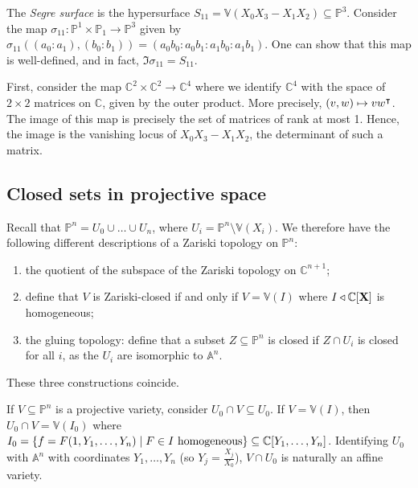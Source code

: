 \begin{example}
    The \emph{Segre surface} is the hypersurface \( S_{11} = \mathbb V(X_0X_3 - X_1X_2) \subseteq \mathbb P^3 \).
    Consider the map \( \sigma_{11} \colon \mathbb P^1 \times \mathbb P_1 \to \mathbb P^3 \) given by \( \sigma_{11}((a_0 : a_1), (b_0 : b_1)) = (a_0 b_0 : a_0 b_1 : a_1 b_0 : a_1 b_1) \).
    One can show that this map is well-defined, and in fact, \( \Im \sigma_{11} = S_{11} \).

    First, consider the map \( \mathbb C^2 \times \mathbb C^2 \to \mathbb C^4 \) where we identify \( \mathbb C^4 \) with the space of \( 2 \times 2 \) matrices on \( \mathbb C \), given by the outer product.
    More precisely, \( (v,w) \mapsto vw^\intercal \).
    The image of this map is precisely the set of matrices of rank at most 1.
    Hence, the image is the vanishing locus of \( X_0 X_3 - X_1 X_2 \), the determinant of such a matrix.
\end{example}

\subsection{Closed sets in projective space}
Recall that \( \mathbb P^n = U_0 \cup \dots \cup U_n \), where \( U_i = \mathbb P^n \setminus \mathbb V(X_i) \).
We therefore have the following different descriptions of a Zariski topology on \( \mathbb P^n \):
\begin{enumerate}
    \item the quotient of the subspace of the Zariski topology on \( \mathbb C^{n+1} \);
    \item define that \( V \) is Zariski-closed if and only if \( V = \mathbb V(I) \) where \( I \triangleleft \mathbb C[\vb X] \) is homogeneous;
    \item the gluing topology: define that a subset \( Z \subseteq \mathbb P^n \) is closed if \( Z \cap U_i \) is closed for all \( i \), as the \( U_i \) are isomorphic to \( \mathbb A^n \).
\end{enumerate}
These three constructions coincide.

If \( V \subseteq \mathbb P^n \) is a projective variety, consider \( U_0 \cap V \subseteq U_0 \).
If \( V = \mathbb V(I) \), then \( U_0 \cap V = \mathbb V(I_0) \) where \( I_0 = \qty{f = F(1, Y_1, \dots, Y_n) \mid F \in I \text{ homogeneous}} \subseteq \mathbb C[Y_1, \dots, Y_n] \).
Identifying \( U_0 \) with \( \mathbb A^n \) with coordinates \( Y_1, \dots, Y_n \) (so \( Y_j = \frac{X_j}{X_0} \)), \( V \cap U_0 \) is naturally an affine variety.

